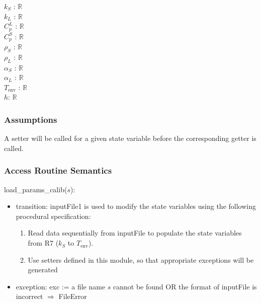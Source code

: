 \documentclass[12pt, titlepage]{article}
\begin{document}
$k_{S}$ : $\mathbb{R}$\\
$k_{L}$ :  $\mathbb{R}$\\
$C_{p}^L$ :  $\mathbb{R}$\\
$C_p^S$ :  $\mathbb{R}$\\
$\rho_S$ :  $\mathbb{R}$ \\
$\rho_L$ :  $\mathbb{R}$\\
$\alpha_S$ :  $\mathbb{R}$\\
$\alpha_L$ :  $\mathbb{R}$\\
$T_{\text{env}}$ :  $\mathbb{R}$\\
$h$: $\mathbb{R}$\\

\subsubsection{Assumptions}

A setter will be called for a given state variable before the corresponding
getter is called.

\subsubsection{Access Routine Semantics}

\noindent load\_params\_calib($s$):
\begin{itemize}
\item transition:  {inputFile1} is used to modify the state variables using the following procedural specification:

\begin{enumerate}

\item Read data sequentially from inputFile to populate the state variables from
  R7 ($k_S$ to $T_{\text{env}}$).
\item Use setters defined in this module, so that appropriate exceptions will be generated

\end{enumerate}

\item exception: exc := a file name $s$ cannot be found OR the format of
  inputFile is incorrect $\Rightarrow$  FileError

\end{itemize}
\end{document}
